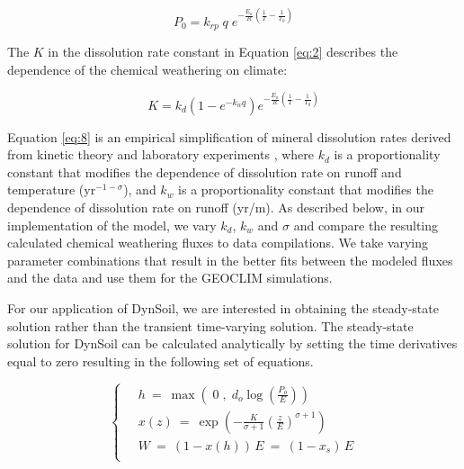 \documentclass[11pt,letterpaper]{article}
\begin{document}
\begin{equation}
    P_{0} = k_{rp}\;q\;e^{-\frac{E_{a}}{R}\left(\frac{1}{T}-\frac{1}{T_{0}}\right)}
    \label{eq:6}
\end{equation}


The $K$ in the dissolution rate constant in Equation \ref{eq:2} describes the dependence of the chemical weathering on climate:

\begin{equation}
    K = k_{d}\left(1-e^{-k_{w}q}\right)e^{-\frac{E_{a}}{R}\left(\frac{1}{T}-\frac{1}{T_{0}}\right)}
    \label{eq:8}
\end{equation}

\noindent
Equation \ref{eq:8} is an empirical simplification of mineral dissolution rates derived from kinetic theory and laboratory experiments \citep{West2012a}, where $k_{d}$ is a proportionality constant that modifies the dependence of dissolution rate on runoff and temperature (yr$^{-1-\sigma}$), and $k_{w}$ is a proportionality constant that modifies the dependence of dissolution rate on runoff (yr/m). As described below, in our implementation of the model, we vary $k_{d}$, $k_{w}$ and $\sigma$ and compare the resulting calculated chemical weathering fluxes to data compilations. We take varying parameter combinations that result in the better fits between the modeled fluxes and the data and use them for the GEOCLIM simulations.

For our application of DynSoil, we are interested in obtaining the steady-state solution rather than the transient time-varying solution. The steady-state solution for DynSoil can be calculated analytically by setting the time derivatives equal to zero resulting in the following set of equations.

\begin{equation}\label{eq:dynsoil_ss}
\left\{\ 
\begin{aligned}
& h   \ =\    \max\left(  \;  0  \;,\;  d_o \log\left(\frac{P_o}{E}\right)  \right)                                                 \\
& x(z)      \ =\   \exp\left(   - \frac{K}{\sigma+1}  \left(\frac{z}{E}\right)^{\sigma+1}   \right)   \\
& W        \ =\   (1-x(h)) \, E  \ =\   (1-x_s) \, E                                                                         \\
\end{aligned}
\right.
\end{equation}
\end{document}
